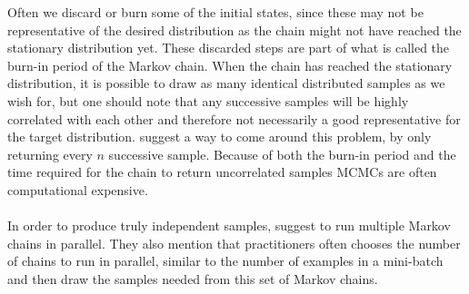 Often we discard or burn some of the initial states, since these may not be representative of the desired distribution as the chain might not have reached the stationary distribution yet. These discarded steps are part of what is called the  burn-in period of the Markov chain. When the chain has reached the stationary distribution, it is possible to draw as many identical distributed samples as we wish for, but one should note that any successive samples will be highly correlated with each other and therefore not necessarily a good representative for the target distribution. \cite{Goodfellow-et-al-2016} suggest a way to come around this problem, by only returning every $n$ successive sample. Because of both the burn-in period and the time required for the chain to return uncorrelated samples MCMCs are often computational expensive. \\
\\
In order to produce truly independent samples, \cite{Goodfellow-et-al-2016} suggest to run multiple Markov chains in parallel. They also mention that practitioners often chooses the number of chains to run in parallel, similar to the number of examples in a mini-batch and then draw the samples needed from this set of Markov chains. 


